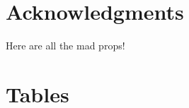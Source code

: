 \documentclass[11pt,
  english,
  a4paper,
]{article}
\begin{document}

\hypertarget{acknowledgments}{%
\section{Acknowledgments}\label{acknowledgments}}

\leavevmode\tagmcend\tagstructend

Here are all the mad props!



\hypertarget{tables}{%
\section{Tables}\label{tables}}

\leavevmode\tagmcend\tagstructend
\end{document}
